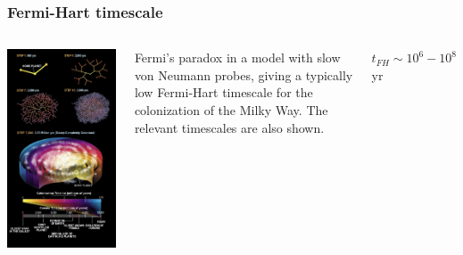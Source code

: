 \begin{frame}
\frametitle{Fermi-Hart timescale}

\begin{columns}
\includegraphics[scale=0.5]{colonisation.png} 

Fermi’s paradox in a model with slow von Neumann probes, giving a typically low Fermi-Hart timescale for the colonization of the Milky Way. The relevant timescales are also shown.

$t_{FH} \sim 10^6-10^8$ yr
\end{columns}
\end{frame}
